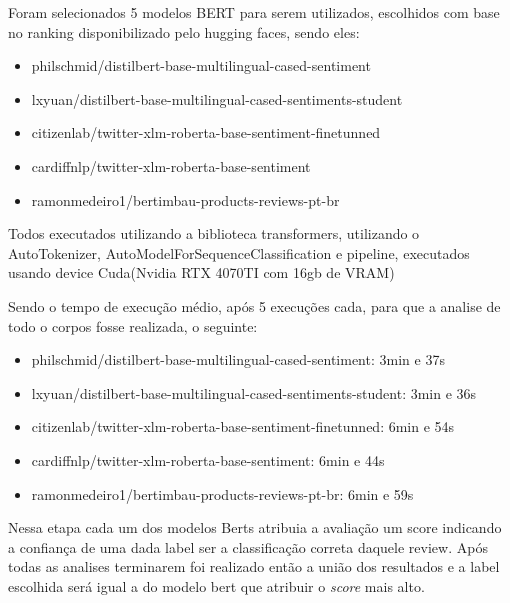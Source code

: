 
Foram selecionados 5 modelos BERT para serem utilizados, escolhidos com base no ranking disponibilizado pelo hugging faces, sendo eles:
\begin{itemize}
	\item philschmid/distilbert-base-multilingual-cased-sentiment
	\item lxyuan/distilbert-base-multilingual-cased-sentiments-student
	\item citizenlab/twitter-xlm-roberta-base-sentiment-finetunned
	\item cardiffnlp/twitter-xlm-roberta-base-sentiment
	\item ramonmedeiro1/bertimbau-products-reviews-pt-br
\end{itemize}

Todos executados utilizando a biblioteca transformers, utilizando o AutoTokenizer, AutoModelForSequenceClassification e pipeline, executados usando device Cuda(Nvidia RTX 4070TI com 16gb de VRAM) %

Sendo o tempo de execução médio, após 5 execuções cada, para que a analise de todo o corpos fosse realizada, o seguinte:

\begin{itemize}
	\item philschmid/distilbert-base-multilingual-cased-sentiment: 3min e 37s
	\item lxyuan/distilbert-base-multilingual-cased-sentiments-student: 3min e 36s
	\item citizenlab/twitter-xlm-roberta-base-sentiment-finetunned: 6min e 54s
	\item cardiffnlp/twitter-xlm-roberta-base-sentiment: 6min e 44s
	\item ramonmedeiro1/bertimbau-products-reviews-pt-br: 6min e 59s
\end{itemize}

Nessa etapa cada um dos modelos Berts atribuia a avaliação um score indicando a confiança de uma dada label ser a classificação correta daquele review. Após todas as analises terminarem foi realizado então a união dos resultados e a label escolhida será igual a do modelo bert que atribuir o \emph{score} mais alto.


